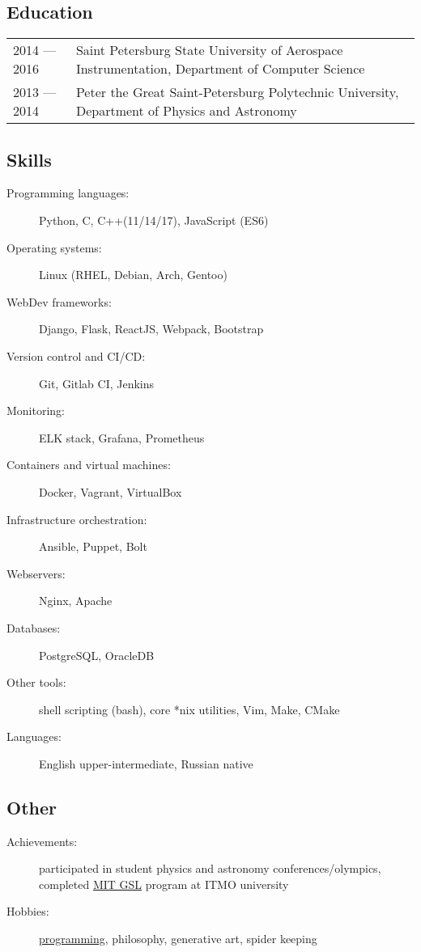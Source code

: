 \documentclass[12pt]{report}
\begin{document}
\subsection*{Education}
\begin{table}[H]
    \begin{tabular}{@{}p{}p{}}
        2014 --- 2016 & Saint Petersburg State University of Aerospace Instrumentation, Department of Computer Science \\
        2013 --- 2014 & Peter the Great Saint-Petersburg Polytechnic University, Department of Physics and Astronomy
    \end{tabular}
\end{table}

\subsection*{Skills}
\begin{description}
    \item[Programming languages:]
    Python, C, C++(11/14/17), JavaScript (ES6)
    \item[Operating systems:]
    Linux (RHEL, Debian, Arch, Gentoo)
    \item[WebDev frameworks:]
    Django, Flask, ReactJS, Webpack, Bootstrap
    \item[Version control and CI/CD:]
    Git, Gitlab CI, Jenkins
    \item[Monitoring:]
    ELK stack, Grafana, Prometheus
    \item[Containers and virtual machines:]
    Docker, Vagrant, VirtualBox
    \item[Infrastructure orchestration:]
    Ansible, Puppet, Bolt
    \item[Webservers:]
    Nginx, Apache
    \item[Databases:]
    PostgreSQL, OracleDB
    \item[Other tools:]
    shell scripting (bash), core *nix utilities, Vim, Make, CMake
    \item[Languages:]
    English upper-intermediate, Russian native
\end{description}

\subsection*{Other}
\begin{description}
    \item[Achievements:]
        participated in student physics and astronomy conferences/olympics,
        completed \href{https://gsl.mit.edu/}{MIT GSL} program at ITMO university
    \item[Hobbies:]
    \href{https://github.com/unsip}{programming}, philosophy, generative art, spider keeping
\end{description}
\end{document}
